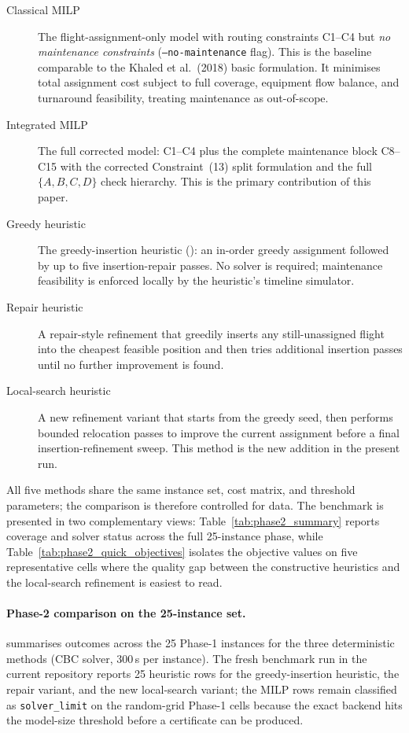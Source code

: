 \begin{description}
  \item[Classical MILP] The flight-assignment-only model with routing
    constraints C1--C4 but \emph{no maintenance constraints} (\texttt{--no-maintenance}
    flag).  This is the baseline comparable to the Khaled et al.\ (2018) basic
    formulation.  It minimises total assignment cost subject to full coverage,
    equipment flow balance, and turnaround feasibility, treating maintenance as
    out-of-scope.
  \item[Integrated MILP] The full corrected model: C1--C4 plus the complete
    maintenance block C8--C15 with the corrected Constraint~(13) split
    formulation and the full $\{A,B,C,D\}$ check hierarchy.  This is the
    primary contribution of this paper.
  \item[Greedy heuristic] The greedy-insertion heuristic
    (): an in-order greedy assignment followed by up to
    five insertion-repair passes.  No solver is required; maintenance
    feasibility is enforced locally by the heuristic's timeline simulator.
  \item[Repair heuristic] A repair-style refinement that greedily inserts any
    still-unassigned flight into the cheapest feasible position and then tries
    additional insertion passes until no further improvement is found.
  \item[Local-search heuristic] A new refinement variant that starts from the
    greedy seed, then performs bounded relocation passes to improve the current
    assignment before a final insertion-refinement sweep.  This method is the
    new addition in the present run.
\end{description}

All five methods share the same instance set, cost matrix, and threshold
parameters; the comparison is therefore controlled for data.  The benchmark is
presented in two complementary views: Table~\ref{tab:phase2_summary} reports
coverage and solver status across the full 25-instance phase, while
Table~\ref{tab:phase2_quick_objectives} isolates the objective values on five
representative cells where the quality gap between the constructive heuristics
and the local-search refinement is easiest to read.

\paragraph{Phase-2 comparison on the 25-instance set.}
 summarises outcomes across the 25 Phase-1 instances
for the three deterministic methods
(CBC solver, 300\,s per instance).
The fresh benchmark run in the current repository reports 25 heuristic rows for
the greedy-insertion heuristic, the repair variant, and the new local-search
variant; the MILP rows remain classified as \texttt{solver\_limit} on the
random-grid Phase-1 cells because the exact backend hits the model-size
threshold before a certificate can be produced.

